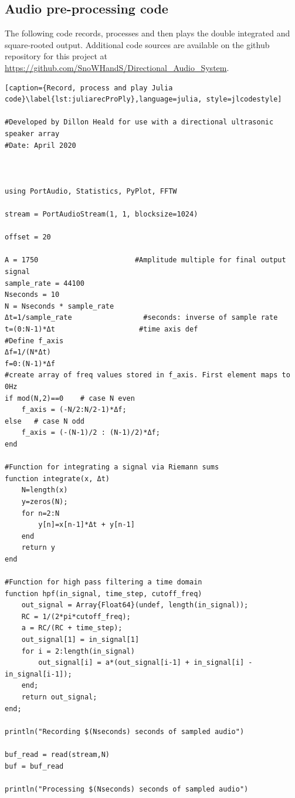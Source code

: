\appendix
\begin{appendices}
\section{Audio pre-processing code}


The following code records, processes and then plays the double integrated and square-rooted output. Additional code sources are available on the github repository for this project at \url{https://github.com/SnoWHandS/Directional_Audio_System}.

\begin{lstlisting}[caption={Record, process and play Julia code}\label{lst:juliarecProPly},language=julia, style=jlcodestyle]

#Developed by Dillon Heald for use with a directional ultrasonic speaker array
#Date: April 2020



using PortAudio, Statistics, PyPlot, FFTW

stream = PortAudioStream(1, 1, blocksize=1024)

offset = 20

A = 1750                       #Amplitude multiple for final output signal
sample_rate = 44100
Nseconds = 10
N = Nseconds * sample_rate
Δt=1/sample_rate                 #seconds: inverse of sample rate
t=(0:N-1)*Δt                    #time axis def
#Define f_axis
Δf=1/(N*Δt)
f=0:(N-1)*Δf
#create array of freq values stored in f_axis. First element maps to 0Hz
if mod(N,2)==0    # case N even
    f_axis = (-N/2:N/2-1)*Δf;    
else   # case N odd
    f_axis = (-(N-1)/2 : (N-1)/2)*Δf; 
end

#Function for integrating a signal via Riemann sums
function integrate(x, Δt)
    N=length(x)
    y=zeros(N);
    for n=2:N
        y[n]=x[n-1]*Δt + y[n-1]
    end
    return y
end

#Function for high pass filtering a time domain
function hpf(in_signal, time_step, cutoff_freq)
    out_signal = Array{Float64}(undef, length(in_signal));
    RC = 1/(2*pi*cutoff_freq);
    a = RC/(RC + time_step);
    out_signal[1] = in_signal[1]
    for i = 2:length(in_signal)
        out_signal[i] = a*(out_signal[i-1] + in_signal[i] - in_signal[i-1]);
    end;
    return out_signal;
end;

println("Recording $(Nseconds) seconds of sampled audio")

buf_read = read(stream,N)
buf = buf_read

println("Processing $(Nseconds) seconds of sampled audio")


\end{lstlisting}
\end{appendices}
